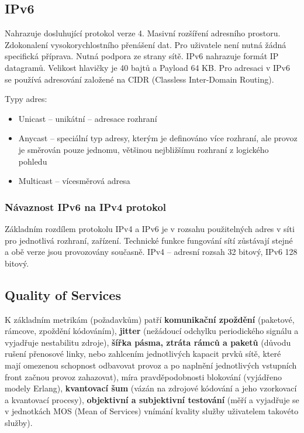 \subsection{IPv6}
Nahrazuje dosluhující protokol verze 4. Masivní rozšíření adresního prostoru. Zdokonalení vysokorychlostního přenášení dat. Pro uživatele není nutná žádná specifická příprava. Nutná podpora ze strany sítě. IPv6 nahrazuje formát IP datagramů. Velikost hlavičky je 40 bajtů a Payload 64 KB. Pro adresaci v IPv6 se používá adresování založené na CIDR (Classless Inter-Domain Routing).

Typy adres:
\begin{itemize}
    \item Unicast -- unikátní -- adresace rozhraní
    \item Anycast -- speciální typ adresy, kterým je definováno více rozhraní, ale provoz je směrován pouze jednomu, většinou nejbližšímu rozhraní z logického pohledu
    \item Multicast -- vícesměrová adresa
\end{itemize}

\subsubsection{Návaznost IPv6 na IPv4 protokol}
Základním rozdílem protokolu IPv4 a IPv6 je v rozsahu použitelných adres v síti pro jednotlivá rozhraní, zařízení. Technické funkce fungování sítí zůstávají stejné a obě verze jsou provozovány současně. IPv4 -- adresní rozsah 32 bitový, IPv6 128 bitový.

\subsection{Quality of Services}
K základním metrikám (požadavkům) patří \textbf{komunikační zpoždění} (paketové, rámcove, zpoždění kódováním), \textbf{jitter} (nežádoucí odchylku periodického signálu a vyjadřuje nestabilitu zdroje), \textbf{šířka pásma, ztráta rámců a paketů} (důvodu rušení přenosové linky, nebo zahlcením jednotlivých kapacit prvků sítě, které mají omezenou schopnost odbavovat provoz a po naplnění jednotlivých vstupních front začnou provoz zahazovat), míra pravděpodobnosti blokování (vyjádřeno modely Erlang), \textbf{kvantovací šum} (vázán na zdrojové kódování a jeho vzorkovací
a kvantovací procesy), \textbf{objektivní a subjektivní testování} (měří a vyjadřuje se v jednotkách MOS (Mean of Services) vnímání kvality služby uživatelem takovéto služby).

